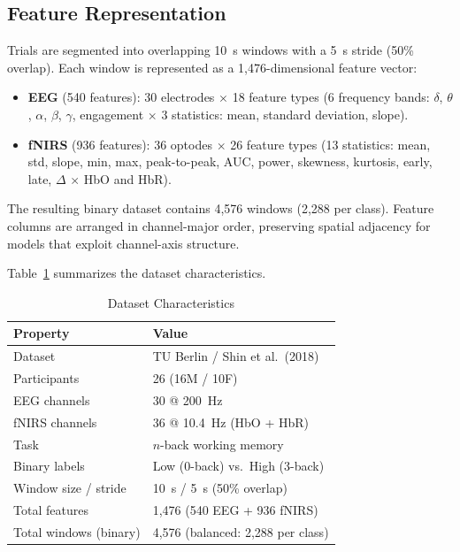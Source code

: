 \documentclass[conference]{IEEEtran}
\begin{document}
\subsection{Feature Representation}
Trials are segmented into overlapping \SI{10}{\second} windows with a \SI{5}{\second} stride (50\% overlap). Each window is represented as a 1{,}476-dimensional feature vector:
\begin{itemize}
    \item \textbf{EEG} (540 features): 30 electrodes $\times$ 18 feature types (6 frequency bands: $\delta$, $\theta$, $\alpha$, $\beta$, $\gamma$, engagement $\times$ 3 statistics: mean, standard deviation, slope).
    \item \textbf{fNIRS} (936 features): 36 optodes $\times$ 26 feature types (13 statistics: mean, std, slope, min, max, peak-to-peak, AUC, power, skewness, kurtosis, early, late, $\Delta$ $\times$ HbO and HbR).
\end{itemize}

The resulting binary dataset contains 4{,}576 windows (2{,}288 per class). Feature columns are arranged in channel-major order, preserving spatial adjacency for models that exploit channel-axis structure.

Table~\ref{tab:dataset} summarizes the dataset characteristics.

\begin{table}[t]
\centering
\caption{Dataset Characteristics}
\label{tab:dataset}
\begin{tabular}{ll}
\toprule
\textbf{Property} & \textbf{Value} \\
\midrule
Dataset & TU Berlin / Shin et al.\ (2018) \\
Participants & 26 (16M / 10F) \\
EEG channels & 30 @ \SI{200}{\hertz} \\
fNIRS channels & 36 @ \SI{10.4}{\hertz} (HbO + HbR) \\
Task & $n$-back working memory \\
Binary labels & Low (0-back) vs.\ High (3-back) \\
Window size / stride & \SI{10}{\second} / \SI{5}{\second} (50\% overlap) \\
Total features & 1{,}476 (540 EEG + 936 fNIRS) \\
Total windows (binary) & 4{,}576 (balanced: 2{,}288 per class) \\
\bottomrule
\end{tabular}
\end{table}
\end{document}
